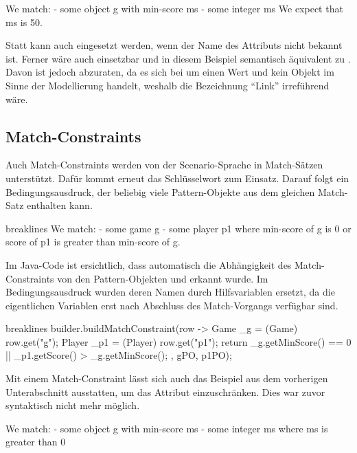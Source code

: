 \begin{mdcodeblock}
    We match:
    - some object g with min-score ms
    - some integer ms
    We expect that ms is 50.
\end{mdcodeblock}

Statt  kann auch  eingesetzt werden, wenn der Name des Attributs nicht bekannt ist.
Ferner wäre auch  einsetzbar und in diesem Beispiel semantisch äquivalent zu .
Davon ist jedoch abzuraten, da es sich bei  um einen Wert und kein Objekt im Sinne der Modellierung handelt, weshalb die Bezeichnung ``Link'' irreführend wäre.

\subsection{Match-Constraints}

Auch Match-Constraints werden von der Scenario-Sprache in Match-Sätzen unterstützt.
Dafür kommt erneut das Schlüsselwort  zum Einsatz.
Darauf folgt ein Bedingungsausdruck, der beliebig viele Pattern-Objekte aus dem gleichen Match-Satz enthalten kann.

\begin{mdcodeblock*}{breaklines}
    We match:
    - some game g
    - some player p1
    where min-score of g is 0 or score of p1 is greater than min-score of g.
\end{mdcodeblock*}

Im Java-Code ist ersichtlich, dass automatisch die Abhängigkeit des Match-Constraints von den Pattern-Objekten  und  erkannt wurde.
Im Bedingungsausdruck wurden deren Namen durch Hilfsvariablen ersetzt, da die eigentlichen Variablen erst nach Abschluss des Match-Vorgangs verfügbar sind.

\begin{jcodeblock*}{breaklines}
    builder.buildMatchConstraint(row -> {
        Game _g = (Game) row.get("g");
        Player _p1 = (Player) row.get("p1");
        return _g.getMinScore() == 0 || _p1.getScore() > _g.getMinScore();
    }, gPO, p1PO);
\end{jcodeblock*}

Mit einem Match-Constraint lässt sich auch das Beispiel aus dem vorherigen Unterabschnitt ausstatten, um das Attribut  einzuschränken.
Dies war zuvor syntaktisch nicht mehr möglich.

\begin{mdcodeblock}
    We match:
    - some object g with min-score ms
    - some integer ms where ms is greater than 0
\end{mdcodeblock}
